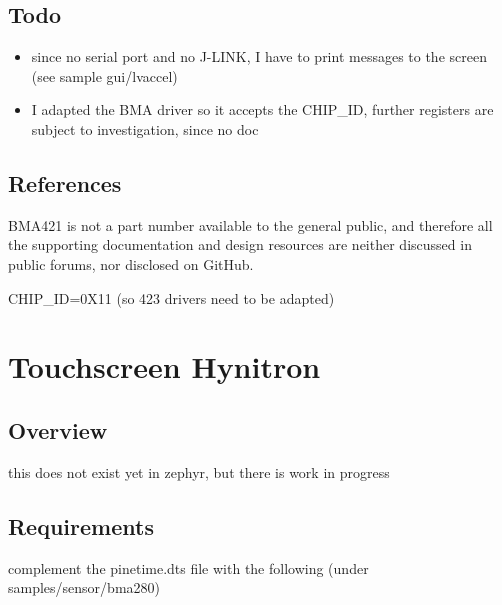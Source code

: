 \documentclass[letterpaper,10pt,english]{sphinxmanual}
\begin{document}
\subsection{Todo}
\label{\detokenize{behind/bma280:todo}}\begin{itemize}
\item {} 
since no serial port and no J-LINK, I have to print messages to the screen (see sample gui/lvaccel)

\item {} 
I adapted the BMA driver so it accepts the CHIP\_ID, further registers are subject to investigation, since no doc

\end{itemize}


\subsection{References}
\label{\detokenize{behind/bma280:references}}
BMA421 is not a part number available to the general public, and therefore all the supporting documentation and design resources are neither discussed in public forums, nor disclosed on GitHub.

CHIP\_ID=0X11  (so 423 drivers need to be adapted)


\section{Touchscreen Hynitron}
\label{\detokenize{behind/touchscreen:touchscreen-hynitron}}\label{\detokenize{behind/touchscreen::doc}}
\begin{sphinxVerbatim}[commandchars=\\\{\}]
\end{sphinxVerbatim}


\subsection{Overview}
\label{\detokenize{behind/touchscreen:overview}}
this does not exist yet in zephyr, but there is work in progress


\subsection{Requirements}
\label{\detokenize{behind/touchscreen:requirements}}
complement the pinetime.dts file with the following (under samples/sensor/bma280)
\end{document}
